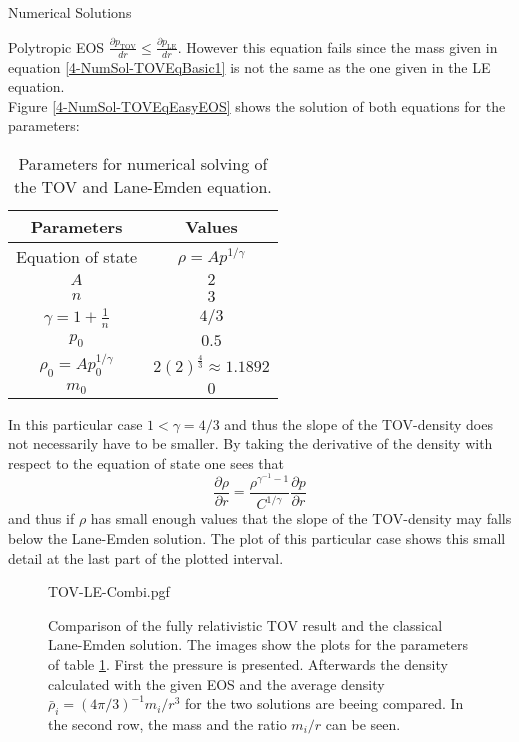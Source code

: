 \begin{section}{Numerical Solutions}
\begin{subsection}{Polytropic EOS}
$\frac{\partial p_{\text{TOV}}}{dr} \leq \frac{\partial p_{\text{LE}}}{dr}.$
However this equation fails since the mass given in equation \ref{4-NumSol-TOVEqBasic1} is not the same as the one given in the LE equation.\\
Figure \ref{4-NumSol-TOVEqEasyEOS} shows the solution of both equations for the parameters:
\begin{table}[H]
	\centering
	\begin{tabular}{|c|c|}
		\hline
		Parameters & Values \\
		\hline
		Equation of state & $\rho=Ap^{1/\gamma}$ \\
		$A$ & $2$\\
		$n$ & $3$\\
		$\gamma=1+\frac{1}{n}$ & $4/3$ \\
		$p_0$ & $0.5$ \\
		$\rho_0=Ap_0^{1/\gamma}$ & $2(2)^{\frac{4}{3}}\approx1.1892$\\
		$m_0$ & $0$\\
		\hline
	\end{tabular}
	\caption[Numerical Parameters for TOV and Lane-Emden equation]{Parameters for numerical solving of the TOV and Lane-Emden equation.}
	\label{4-NumSol-TOVParameters}
\end{table}
In this particular case $1<\gamma=4/3$ and thus the slope of the TOV-density does not necessarily have to be smaller. By taking the derivative of the density with respect to the equation of state one sees that
\begin{equation}
	\frac{\partial\rho}{\partial r} = \frac{\rho^{\gamma^{-1}-1}}{C^{1/\gamma}}\frac{\partial p}{\partial r}
\end{equation}
and thus if $\rho$ has small enough values that the slope of the TOV-density may falls below the Lane-Emden solution. The plot of this particular case shows this small detail at the last part of the plotted interval.
\begin{figure}[H]
	\centering
	{TOV-LE-Combi.pgf}
	\caption[Comparison TOV and LE equation]{Comparison of the fully relativistic TOV result and the classical Lane-Emden solution. The images show the plots for the parameters of table \ref{4-NumSol-TOVParameters}. First the pressure is presented. Afterwards the density calculated with the given EOS and the average density $\bar{\rho}_i=(4\pi/3)^{-1}m_i/r^3$ for the two solutions are beeing compared. In the second row, the mass and the ratio $m_i/r$ can be seen.}

\end{figure}
\end{subsection}
\end{section}

